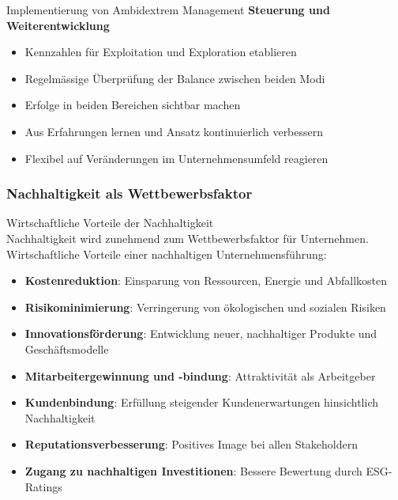 \begin{KR}{Implementierung von Ambidextrem Management}
\textbf{Steuerung und Weiterentwicklung}
\begin{itemize}
    \item Kennzahlen für Exploitation und Exploration etablieren
    \item Regelmässige Überprüfung der Balance zwischen beiden Modi
    \item Erfolge in beiden Bereichen sichtbar machen
    \item Aus Erfahrungen lernen und Ansatz kontinuierlich verbessern
    \item Flexibel auf Veränderungen im Unternehmensumfeld reagieren
\end{itemize}
\end{KR}



\subsubsection{Nachhaltigkeit als Wettbewerbsfaktor}

\begin{concept}{Wirtschaftliche Vorteile der Nachhaltigkeit}\\
Nachhaltigkeit wird zunehmend zum Wettbewerbsfaktor für Unternehmen. Wirtschaftliche Vorteile einer nachhaltigen Unternehmensführung:
\begin{itemize}
    \item \textbf{Kostenreduktion}: Einsparung von Ressourcen, Energie und Abfallkosten
    \item \textbf{Risikominimierung}: Verringerung von ökologischen und sozialen Risiken
    \item \textbf{Innovationsförderung}: Entwicklung neuer, nachhaltiger Produkte und Geschäftsmodelle
    \item \textbf{Mitarbeitergewinnung und -bindung}: Attraktivität als Arbeitgeber
    \item \textbf{Kundenbindung}: Erfüllung steigender Kundenerwartungen hinsichtlich Nachhaltigkeit
    \item \textbf{Reputationsverbesserung}: Positives Image bei allen Stakeholdern
    \item \textbf{Zugang zu nachhaltigen Investitionen}: Bessere Bewertung durch ESG-Ratings
\end{itemize}
\end{concept}

